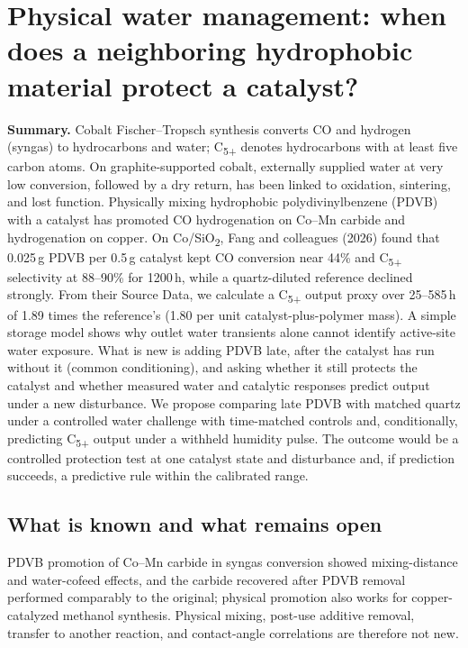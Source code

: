 \section{Physical water management: when does a neighboring hydrophobic material protect a catalyst?}
\label{sec:water}

\textbf{Summary.} Cobalt Fischer--Tropsch synthesis converts CO and hydrogen (syngas) to hydrocarbons and water; C\textsubscript{5+} denotes hydrocarbons with at least five carbon atoms. On graphite-supported cobalt, externally supplied water at very low conversion, followed by a dry return, has been linked to oxidation, sintering, and lost function.\cite{wolf2019} Physically mixing hydrophobic polydivinylbenzene (PDVB) with a catalyst has promoted CO hydrogenation on Co--Mn carbide and \COtwo{} hydrogenation on copper.\cite{fang2022,li2023} On Co/SiO\textsubscript{2}, Fang and colleagues (2026) found that 0.025\,g PDVB per 0.5\,g catalyst kept CO conversion near 44\% and C\textsubscript{5+} selectivity at 88--90\% for 1200\,h, while a quartz-diluted reference declined strongly.\cite{fang2026} From their Source Data, we calculate a C\textsubscript{5+} output proxy over 25--585\,h of 1.89 times the reference's (1.80 per unit catalyst-plus-polymer mass). A simple storage model shows why outlet water transients alone cannot identify active-site water exposure. What is new is adding PDVB late, after the catalyst has run without it (common conditioning), and asking whether it still protects the catalyst and whether measured water and catalytic responses predict output under a new disturbance. We propose comparing late PDVB with matched quartz under a controlled water challenge with time-matched controls and, conditionally, predicting C\textsubscript{5+} output under a withheld humidity pulse. The outcome would be a controlled protection test at one catalyst state and disturbance and, if prediction succeeds, a predictive rule within the calibrated range.

\subsection{What is known and what remains open}

PDVB promotion of Co--Mn carbide in syngas conversion showed mixing-distance and water-cofeed effects, and the carbide recovered after PDVB removal performed comparably to the original; physical promotion also works for copper-catalyzed methanol synthesis.\cite{fang2022,li2023} Physical mixing, post-use additive removal, transfer to another reaction, and contact-angle correlations are therefore not new.

